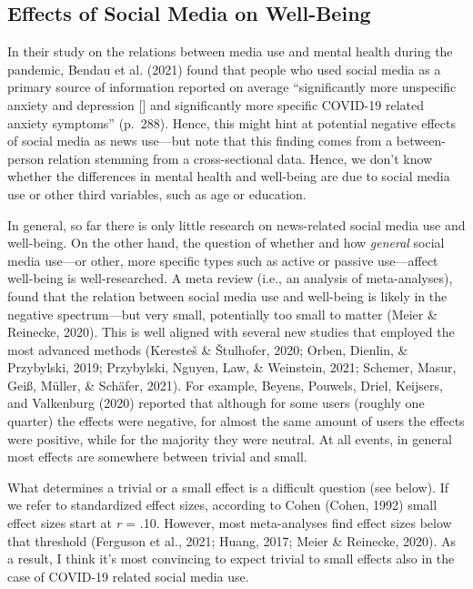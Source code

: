\documentclass[
  english,
  man,mask,floatsintext]{apa6}
\begin{document}
\hypertarget{effects-of-social-media-on-well-being}{%
\subsection{Effects of Social Media on Well-Being}\label{effects-of-social-media-on-well-being}}

In their study on the relations between media use and mental health during the pandemic, Bendau et al. (2021) found that people who used social media as a primary source of information reported on average ``significantly more unspecific anxiety and depression {[}{]} and significantly more specific COVID-19 related anxiety symptoms'' (p.~288).
Hence, this might hint at potential negative effects of social media as news use---but note that this finding comes from a between-person relation stemming from a cross-sectional data.
Hence, we don't know whether the differences in mental health and well-being are due to social media use or other third variables, such as age or education.

In general, so far there is only little research on news-related social media use and well-being.
On the other hand, the question of whether and how \emph{general} social media use---or other, more specific types such as active or passive use---affect well-being is well-researched.
A meta review (i.e., an analysis of meta-analyses), found that the relation between social media use and well-being is likely in the negative spectrum---but very small, potentially too small to matter (Meier \& Reinecke, 2020).
This is well aligned with several new studies that employed the most advanced methods (Keresteš \& Štulhofer, 2020; Orben, Dienlin, \& Przybylski, 2019; Przybylski, Nguyen, Law, \& Weinstein, 2021; Schemer, Masur, Geiß, Müller, \& Schäfer, 2021).
For example, Beyens, Pouwels, Driel, Keijsers, and Valkenburg (2020) reported that although for some users (roughly one quarter) the effects were negative, for almost the same amount of users the effects were positive, while for the majority they were neutral.
At all events, in general most effects are somewhere between trivial and small.

What determines a trivial or a small effect is a difficult question (see below).
If we refer to standardized effect sizes, according to Cohen (Cohen, 1992) small effect sizes start at \emph{r} = .10.
However, most meta-analyses find effect sizes below that threshold (Ferguson et al., 2021; Huang, 2017; Meier \& Reinecke, 2020).
As a result, I think it's most convincing to expect trivial to small effects also in the case of COVID-19 related social media use.
\end{document}
